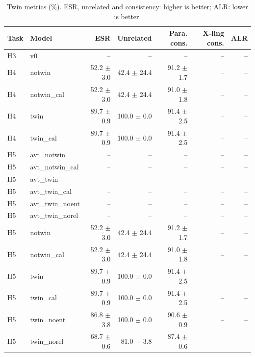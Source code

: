 \begin{table}[t]
\centering
\caption{Twin metrics (\%). ESR, unrelated and consistency: higher is better; ALR: lower is better.}
\label{tab:twins}
\begin{tabular}{llrrrrr}
\toprule
Task & Model & ESR & Unrelated & Para. cons. & X-ling cons. & ALR \\
\midrule
H3 & v0 & -- & -- & -- & -- & -- \\
H4 & notwin & 52.2 $\pm$ 3.0 & 42.4 $\pm$ 24.4 & 91.2 $\pm$ 1.7 & -- & -- \\
H4 & notwin\_cal & 52.2 $\pm$ 3.0 & 42.4 $\pm$ 24.4 & 91.0 $\pm$ 1.8 & -- & -- \\
H4 & twin & 89.7 $\pm$ 0.9 & 100.0 $\pm$ 0.0 & 91.4 $\pm$ 2.5 & -- & -- \\
H4 & twin\_cal & 89.7 $\pm$ 0.9 & 100.0 $\pm$ 0.0 & 91.4 $\pm$ 2.5 & -- & -- \\
H5 & avt\_notwin & -- & -- & -- & -- & -- \\
H5 & avt\_notwin\_cal & -- & -- & -- & -- & -- \\
H5 & avt\_twin & -- & -- & -- & -- & -- \\
H5 & avt\_twin\_cal & -- & -- & -- & -- & -- \\
H5 & avt\_twin\_noent & -- & -- & -- & -- & -- \\
H5 & avt\_twin\_norel & -- & -- & -- & -- & -- \\
H5 & notwin & 52.2 $\pm$ 3.0 & 42.4 $\pm$ 24.4 & 91.2 $\pm$ 1.7 & -- & -- \\
H5 & notwin\_cal & 52.2 $\pm$ 3.0 & 42.4 $\pm$ 24.4 & 91.0 $\pm$ 1.8 & -- & -- \\
H5 & twin & 89.7 $\pm$ 0.9 & 100.0 $\pm$ 0.0 & 91.4 $\pm$ 2.5 & -- & -- \\
H5 & twin\_cal & 89.7 $\pm$ 0.9 & 100.0 $\pm$ 0.0 & 91.4 $\pm$ 2.5 & -- & -- \\
H5 & twin\_noent & 86.8 $\pm$ 3.8 & 100.0 $\pm$ 0.0 & 90.6 $\pm$ 0.9 & -- & -- \\
H5 & twin\_norel & 68.7 $\pm$ 0.6 & 81.0 $\pm$ 3.8 & 87.4 $\pm$ 0.6 & -- & -- \\
\bottomrule
\end{tabular}
\end{table}
